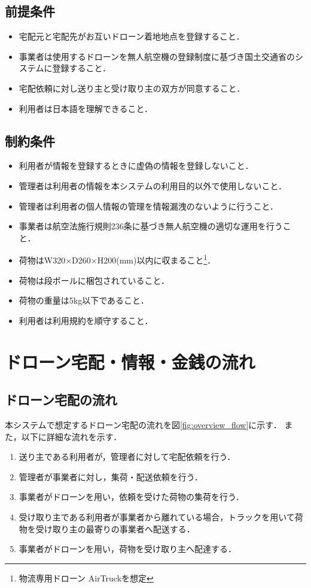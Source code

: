 \documentclass[a4paper, titlepage]{jsarticle}
\begin{document}
\subsection{前提条件}
\begin{itemize}
  \item 宅配元と宅配先がお互いドローン着地地点を登録すること．
  \item 事業者は使用するドローンを無人航空機の登録制度に基づき国土交通省のシステムに登録すること．
  \item 宅配依頼に対し送り主と受け取り主の双方が同意すること．
  \item 利用者は日本語を理解できること．
\end{itemize}
\subsection{制約条件}
\begin{itemize}
\item 利用者が情報を登録するときに虚偽の情報を登録しないこと．
\item 管理者は利用者の情報を本システムの利用目的以外で使用しないこと．
\item 管理者は利用者の個人情報の管理を情報漏洩のないように行うこと．
\item 事業者は航空法施行規則236条に基づき無人航空機の適切な運用を行うこと．
\item 荷物はW320$\times$D260$\times$H200(mm)以内に収まること\footnote{\label{fot:airtruck}物流専用ドローン AirTruck\cite{aeronext_airtruck}を想定}．
\item 荷物は段ボールに梱包されていること．
\item 荷物の重量は5kg以下であること．
\item 利用者は利用規約を順守すること．
\end{itemize}
\section{ドローン宅配・情報・金銭の流れ}

\subsection{ドローン宅配の流れ}
本システムで想定するドローン宅配の流れを図\ref{fig:overview_flow}に示す．
また，以下に詳細な流れを示す．

\begin{enumerate}[label=\raise0.2ex\hbox{\textcircled{\scriptsize{\arabic*}}}]
\item 送り主である利用者が，管理者に対して宅配依頼を行う．
\item 管理者が事業者に対し，集荷・配送依頼を行う．
\item 事業者がドローンを用い，依頼を受けた荷物の集荷を行う．
\item 受け取り主である利用者が事業者から離れている場合，トラックを用いて荷物を受け取り主の最寄りの事業者へ配送する．
\item 事業者がドローンを用い，荷物を受け取り主へ配達する．
\end{enumerate}
\end{document}
